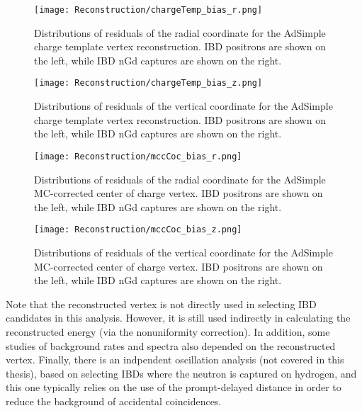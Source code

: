 \documentclass[../thesis.tex]{subfiles}
\begin{document}
\begin{figure}[h]
  \texttt{[image: Reconstruction/chargeTemp\_bias\_r.png]}
  \caption{Distributions of residuals of the radial coordinate for the AdSimple charge template vertex reconstruction. IBD positrons are shown on the left, while IBD nGd captures are shown on the right.}
  \label{fig:chargeTemp_bias_r}
\end{figure}

\begin{figure}[h]
  \texttt{[image: Reconstruction/chargeTemp\_bias\_z.png]}
  \caption{Distributions of residuals of the vertical coordinate for the AdSimple charge template vertex reconstruction. IBD positrons are shown on the left, while IBD nGd captures are shown on the right.}
  \label{fig:chargeTemp_bias_z}
\end{figure}

\begin{figure}[h]
  \texttt{[image: Reconstruction/mccCoc\_bias\_r.png]}
  \caption{Distributions of residuals of the radial coordinate for the AdSimple MC-corrected center of charge vertex. IBD positrons are shown on the left, while IBD nGd captures are shown on the right.}
  \label{fig:mccCoc_bias_r}
\end{figure}

\begin{figure}[h]
  \texttt{[image: Reconstruction/mccCoc\_bias\_z.png]}
  \caption{Distributions of residuals of the vertical coordinate for the AdSimple MC-corrected center of charge vertex. IBD positrons are shown on the left, while IBD nGd captures are shown on the right.}
  \label{fig:mccCoc_bias_z}
\end{figure}

Note that the reconstructed vertex is not directly used in selecting IBD candidates in this analysis. However, it is still used indirectly in calculating the reconstructed energy (via the nonuniformity correction). In addition, some studies of background rates and spectra also depended on the reconstructed vertex. Finally, there is an indpendent oscillation analysis (not covered in this thesis), based on selecting IBDs where the neutron is captured on hydrogen, and this one typically relies on the use of the prompt-delayed distance in order to reduce the background of accidental coincidences.
\end{document}
